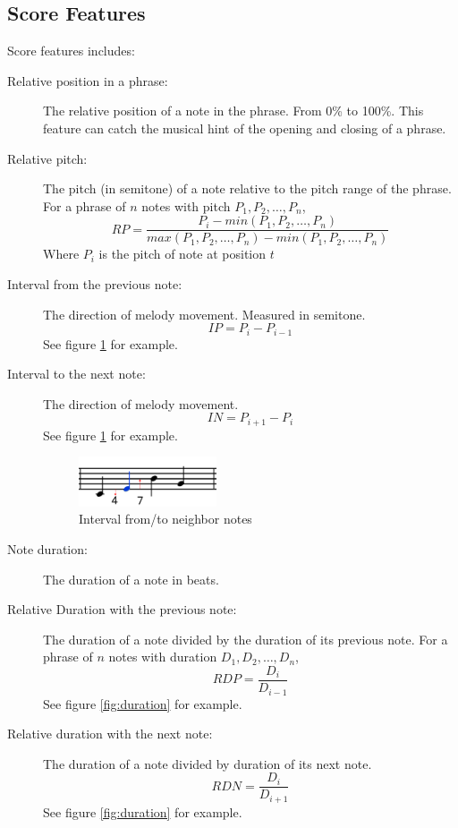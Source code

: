       \subsection{Score Features}
      Score features includes:
      \begin{description}
         \item [Relative position in a phrase:]
            The relative position of a note in the phrase. From 0\% to 100\%. This feature can catch the musical hint of the opening and closing of a phrase.  
         \item [Relative pitch:]
            The pitch (in semitone) of a note relative to the pitch range of the phrase. For a phrase of $n$ notes with pitch $P_1, P_2, \dots, P_n$, $$RP = \frac{P_i -min(P_1, P_2, \dots, P_n) }{max(P_1, P_2, \dots, P_n)-min(P_1, P_2, \dots, P_n) }$$  Where $P_i$ is the pitch of note at position $t$

         \item [Interval from the previous note:] The direction of melody movement. Measured in semitone. $$IP = P_{i} - P_{i-1} $$ See figure \ref{fig:interval} for example.
         \item [Interval to the next note:] The direction of melody movement. $$IN = P_{i+1} - P_i$$ See figure \ref{fig:interval} for example.
         
      \begin{figure}[tp]
         \begin{center}
            \includegraphics[width=0.4\textwidth]{fig/interval_arrow}
         \end{center}
         \caption{Interval from/to neighbor notes}
         \label{fig:interval}
      \end{figure}

         
         \item [Note duration:] The duration of a note in beats.
         \item [Relative Duration with the previous note:] The duration of a note divided by the duration of its previous note. For a phrase of $n$ notes with duration $D_1, D_2, \dots, D_n$, $$RDP = \frac{D_i}{D_{i-1}} $$ See figure \ref{fig:duration} for example.
         \item [Relative duration with the next note:] The duration of a note divided by duration of its next note. $$RDN = \frac{D_i}{D_{i+1}} $$ See figure \ref{fig:duration} for example.


\end{description}
